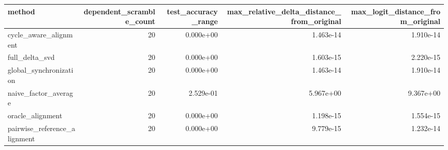 \begin{tabular}{lrrrr}
\toprule
method & dependent\_scramble\_count & test\_accuracy\_range & max\_relative\_delta\_distance\_from\_original & max\_logit\_distance\_from\_original \\
\midrule
cycle\_aware\_alignment & 20 & 0.000e+00 & 1.463e-14 & 1.910e-14 \\
full\_delta\_svd & 20 & 0.000e+00 & 1.603e-15 & 2.220e-15 \\
global\_synchronization & 20 & 0.000e+00 & 1.463e-14 & 1.910e-14 \\
naive\_factor\_average & 20 & 2.529e-01 & 5.967e+00 & 9.367e+00 \\
oracle\_alignment & 20 & 0.000e+00 & 1.198e-15 & 1.554e-15 \\
pairwise\_reference\_alignment & 20 & 0.000e+00 & 9.779e-15 & 1.232e-14 \\
\bottomrule
\end{tabular}
